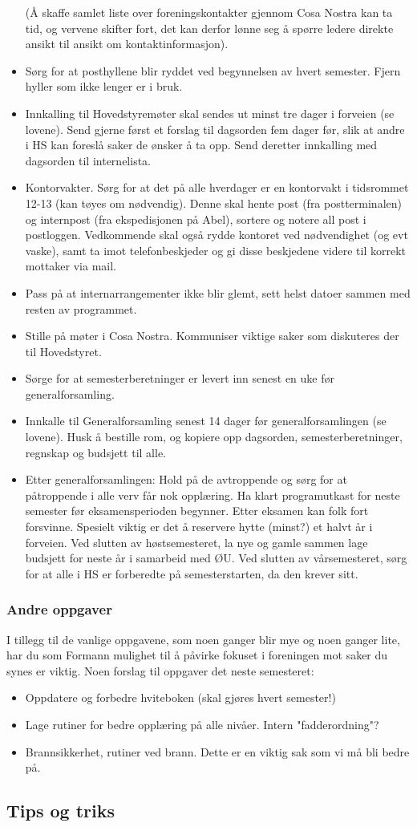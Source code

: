 \begin{itemize}
	(Å skaffe samlet liste over foreningskontakter gjennom Cosa Nostra kan ta tid, og vervene skifter fort,
	det kan derfor lønne seg å spørre ledere direkte ansikt til ansikt om kontaktinformasjon).
\item Sørg for at posthyllene blir ryddet ved begynnelsen av hvert semester. Fjern hyller som ikke lenger er i bruk.
\item Innkalling til Hovedstyremøter skal sendes ut minst tre dager i forveien (se lovene).
	Send gjerne først et forslag til dagsorden fem dager før, slik at andre i HS kan foreslå saker de ønsker
	å ta opp. Send deretter innkalling med dagsorden til internelista.
\item Kontorvakter. Sørg for at det på alle hverdager er en kontorvakt i tidsrommet 12-13 (kan tøyes om nødvendig).
	Denne skal hente post (fra postterminalen) og internpost (fra ekspedisjonen på Abel), sortere og notere all
	post i postloggen. Vedkommende skal også rydde kontoret ved nødvendighet (og evt vaske), samt ta imot
	telefonbeskjeder og gi disse beskjedene videre til korrekt mottaker via mail.
\item Pass på at internarrangementer ikke blir glemt, sett helst datoer sammen med resten av programmet.
\item Stille på møter i Cosa Nostra. Kommuniser viktige saker som diskuteres der til Hovedstyret.
\item Sørge for at semesterberetninger er levert inn senest en uke før generalforsamling.
\item Innkalle til Generalforsamling senest 14 dager før generalforsamlingen (se lovene).
	Husk å bestille rom, og kopiere opp dagsorden, semesterberetninger, regnskap og budsjett til alle.
\item Etter generalforsamlingen: Hold på de avtroppende og sørg for at påtroppende i alle verv får nok opplæring.
	Ha klart programutkast for neste semester før eksamensperioden begynner. Etter eksamen kan folk fort forsvinne.
	Spesielt viktig er det å reservere hytte (minst?) et halvt år i forveien. Ved slutten av høstsemesteret, la
	nye og gamle sammen lage budsjett for neste år i samarbeid med ØU. Ved slutten av vårsemesteret, sørg for
	at alle i HS er forberedte på semesterstarten, da den krever sitt.
\end{itemize}


\subsubsection{Andre oppgaver}
I tillegg til de vanlige oppgavene, som noen ganger blir mye og noen ganger lite, har du som Formann mulighet
til å påvirke fokuset i foreningen mot saker du synes er viktig. Noen forslag til oppgaver det neste semesteret:
\begin{itemize}
\item Oppdatere og forbedre hviteboken (skal gjøres hvert semester!)
\item Lage rutiner for bedre opplæring på alle nivåer. Intern "fadderordning"?
\item Brannsikkerhet, rutiner ved brann. Dette er en viktig sak som vi må bli bedre på.
\end{itemize}


\subsection{Tips og triks}
